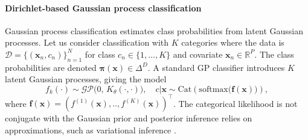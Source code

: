 \paragraph{Dirichlet-based Gaussian process classification}
Gaussian process classification estimates class probabilities from latent Gaussian processes. Let us consider classification with $K$ categories where the data is $\mathcal D=\{(\boldsymbol{x}_n,c_n)\}_{n=1}^N$ for class $c_n\in\{1,\dots,K\}$ and covariate $\boldsymbol{x}_n\in \mathbb{R}^P$. The class probabilities are denoted $\boldsymbol\pi(\boldsymbol{x})\in \Delta^D$. A standard GP classifier introduces $K$ latent Gaussian processes, giving the model 
\begin{equation*}
    f_k(\cdot)\sim \mathcal{GP}\!\bigl(0,\,K_{\theta}(\cdot,\cdot)\bigr),\quad 
    c|\boldsymbol{x}\sim \mathrm{Cat}\left(\mathrm{softmax}\!\bigl(\mathbf f(\boldsymbol{x})\bigr) \right),
\end{equation*}
where $\mathbf f(\boldsymbol{x})= (f^{(1)}(\boldsymbol{x}), .., f^{(K)}(\boldsymbol{x}))^\top$. The categorical likelihood is not conjugate with the Gaussian prior and posterior inference relies on approximations, such as variational inference \citep{Hensman2015}.

